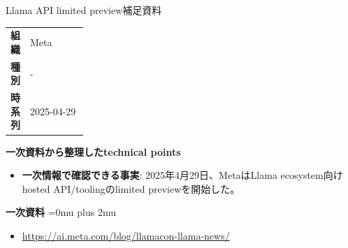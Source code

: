 \begin{technicalnote}{Llama API limited preview}{補足資料}
\begingroup
\begin{tabularx}{\linewidth}{@{}>{\bfseries}p{0.22\linewidth}X@{}}
組織 & Meta \\
種別 & - \\
時系列 & 2025-04-29 \\
\end{tabularx}
\smallskip
{\bfseries 一次資料から整理したtechnical points}
\begin{itemize}[leftmargin=1.5em,itemsep=0.35em]
\item \textbf{一次情報で確認できる事実}: 2025年4月29日、MetaはLlama ecosystem向けhosted API/toolingのlimited previewを開始した。
\end{itemize}
\begin{samepage}
{\bfseries 一次資料}
\begingroup\sloppy
\Urlmuskip=0mu plus 2mu\relax
\begin{itemize}[leftmargin=1.5em,itemsep=0.25em]
\item {\scriptsize\url{https://ai.meta.com/blog/llamacon-llama-news/}}
\end{itemize}
\endgroup
\end{samepage}
\endgroup
\end{technicalnote}
\medskip

